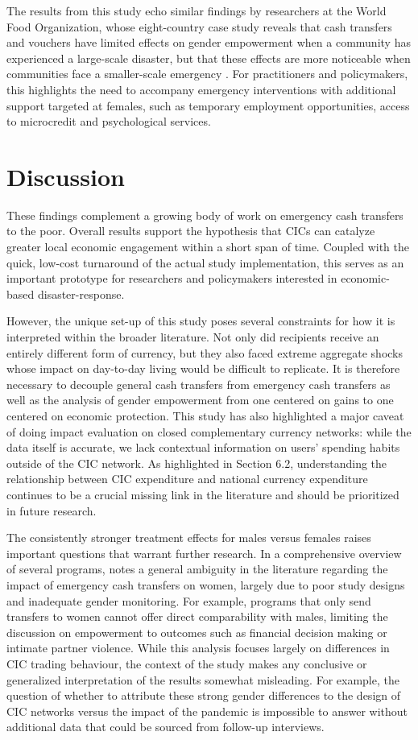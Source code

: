 \documentclass[12pt]{article}
\begin{document}
The results from this study echo similar findings by researchers at the World Food Organization, whose eight-country case study reveals that cash transfers and vouchers have limited effects on gender empowerment when a community has experienced a large-scale disaster, but that these effects are more noticeable when communities face a smaller-scale emergency \citep{berg2013examining}. For practitioners and policymakers, this highlights the need to accompany emergency interventions with additional support targeted at females, such as temporary employment opportunities, access to microcredit and psychological services.


\section{Discussion}
\label{sec:section7}
These findings complement a growing body of work on emergency cash transfers to the poor. Overall results support the hypothesis that CICs can catalyze greater local economic engagement within a short span of time. Coupled with the quick, low-cost turnaround of the actual study implementation, this serves as an important prototype for researchers and policymakers interested in economic-based disaster-response.

However, the unique set-up of this study poses several constraints for how it is interpreted within the broader literature. Not only did recipients receive an entirely different form of currency, but they also faced extreme aggregate shocks whose impact on day-to-day living would be difficult to replicate. It is therefore necessary to decouple general cash transfers from emergency cash transfers as well as the analysis of gender empowerment from one centered on gains to one centered on economic protection. This study has also highlighted a major caveat of doing impact evaluation on closed complementary currency networks: while the data itself is accurate, we lack contextual information on users’ spending habits outside of the CIC network. As highlighted in Section 6.2, understanding the relationship between CIC expenditure and national currency expenditure continues to be a crucial missing link in the literature and should be prioritized in future research.

The consistently stronger treatment effects for males versus females raises important questions that warrant further research. In a comprehensive overview of several programs, \citep{browne2014evidence} notes a general ambiguity in the literature regarding the impact of emergency cash transfers on women, largely due to poor study designs and inadequate gender monitoring. For example, programs that only send transfers to women cannot offer direct comparability with males, limiting the discussion on empowerment to outcomes such as financial decision making or intimate partner violence. While this analysis focuses largely on differences in CIC trading behaviour, the context of the study makes any conclusive or generalized interpretation of the results somewhat misleading. For example, the question of whether to attribute these strong gender differences to the design of CIC networks versus the impact of the pandemic is impossible to answer without additional data that could be sourced from follow-up interviews.
\end{document}
